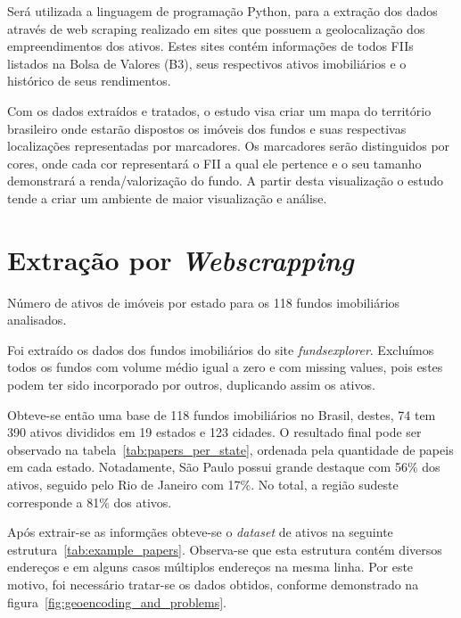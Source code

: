 \label{chap:methodology}

Será utilizada a linguagem de programação Python, para a extração dos dados através de web scraping realizado em sites que possuem a geolocalização dos empreendimentos dos ativos. Estes sites contém informações de todos FIIs listados na Bolsa de Valores (B3), seus respectivos ativos imobiliários e o histórico de seus rendimentos.

Com os dados extraídos e tratados, o estudo visa criar um mapa do território brasileiro onde estarão dispostos os imóveis dos fundos e suas respectivas localizações representadas por marcadores. Os marcadores serão distinguidos por cores, onde cada cor representará o FII a qual ele pertence e o seu tamanho demonstrará a renda/valorização do fundo. A partir desta visualização o estudo tende a criar um ambiente de maior visualização e análise.

\section{Extração por \emph{Webscrapping}}
\label{sec:extraction_by_webscrapping}
\begin{table}
\begin{centering}
\caption{\label{tab:papers_per_state} Número de ativos de imóveis por estado para os 118 fundos imobiliários analisados.}
\end{centering}
\end{table}

Foi extraído os dados dos fundos imobiliários do site \emph{fundsexplorer}. Excluímos todos os fundos com volume médio igual a zero e com missing values, pois estes podem ter sido incorporado por outros, duplicando assim os ativos.

Obteve-se então uma base de 118 fundos imobiliários no Brasil, destes, 74 tem 390 ativos divididos em 19 estados e 123 cidades.  O resultado final pode ser observado na tabela~\ref{tab:papers_per_state}, ordenada pela quantidade de papeis em cada estado. Notadamente, São Paulo possui grande destaque com 56\% dos ativos, seguido pelo Rio de Janeiro com 17\%. No total, a região sudeste corresponde a 81\% dos ativos.

Após extrair-se as informçães obteve-se o \emph{dataset} de ativos na seguinte estrutura~\ref{tab:example_papers}. Observa-se que esta estrutura contém diversos endereços e em alguns casos múltiplos endereços na mesma linha. Por este motivo, foi necessário tratar-se os dados obtidos, conforme demonstrado na figura~\ref{fig:geoencoding_and_problems}.

